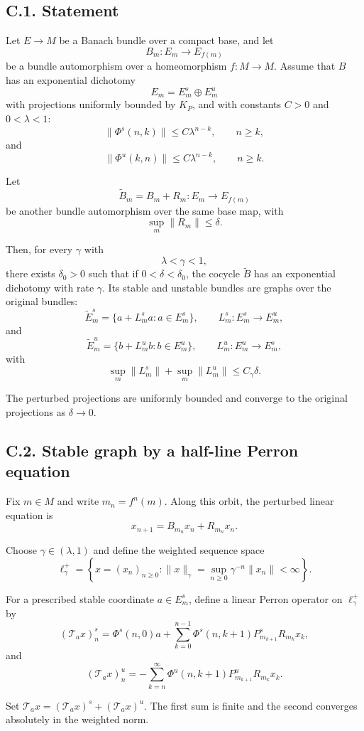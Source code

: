\documentclass[12pt,a4paper]{article}
\theoremstyle{plain}
\numberwithin{equation}{section}
\numberwithin{theorem}{section}
\begin{document}
\subsection{C.1. Statement}

Let $E\to M$ be a Banach bundle over a compact base, and let
\[
B_m:E_m\to E_{f(m)}
\]
be a bundle automorphism over a homeomorphism $f:M\to M$. Assume that $B$ has an exponential dichotomy
\[
E_m=E_m^s\oplus E_m^u
\]
with projections uniformly bounded by $K_P$, and with constants $C>0$ and $0<\lambda<1$:
\[
\|\Phi^s(n,k)\|\le C\lambda^{n-k},
\qquad n\ge k,
\]
and
\[
\|\Phi^u(k,n)\|\le C\lambda^{n-k},
\qquad n\ge k.
\]

Let
\[
\widetilde B_m=B_m+R_m:E_m\to E_{f(m)}
\]
be another bundle automorphism over the same base map, with
\[
\sup_m\|R_m\|\le\delta.
\]

Then, for every $\gamma$ with
\[
\lambda<\gamma<1,
\]
there exists $\delta_0>0$ such that if $0<\delta<\delta_0$, the cocycle $\widetilde B$ has an exponential dichotomy with rate $\gamma$. Its stable and unstable bundles are graphs over the original bundles:
\[
\widetilde E_m^s=\{a+L_m^s a:a\in E_m^s\},
\qquad
L_m^s:E_m^s\to E_m^u,
\]
and
\[
\widetilde E_m^u=\{b+L_m^u b:b\in E_m^u\},
\qquad
L_m^u:E_m^u\to E_m^s,
\]
with
\[
\sup_m\|L_m^s\|+\sup_m\|L_m^u\|
\le C_\gamma\delta.
\]

The perturbed projections are uniformly bounded and converge to the original projections as $\delta\to0$.

\subsection{C.2. Stable graph by a half-line Perron equation}

Fix $m\in M$ and write $m_n=f^n(m)$. Along this orbit, the perturbed linear equation is
\[
x_{n+1}=B_{m_n}x_n+R_{m_n}x_n.
\]

Choose $\gamma\in(\lambda,1)$ and define the weighted sequence space
\[
\ell_\gamma^+
=
\left\{
x=(x_n)_{n\ge0}:
\|x\|_\gamma=
\sup_{n\ge0}\gamma^{-n}\|x_n\|<\infty
\right\}.
\]

For a prescribed stable coordinate $a\in E_m^s$, define a linear Perron operator on $\ell_\gamma^+$ by
\[
(\mathcal T_a x)_n^s
=
\Phi^s(n,0)a
+
\sum_{k=0}^{n-1}
\Phi^s(n,k+1)P^s_{m_{k+1}}R_{m_k}x_k,
\]
and
\[
(\mathcal T_a x)_n^u
=
-
\sum_{k=n}^{\infty}
\Phi^u(n,k+1)P^u_{m_{k+1}}R_{m_k}x_k.
\]

Set $\mathcal T_a x=(\mathcal T_a x)^s+(\mathcal T_a x)^u$. The first sum is finite and the second converges absolutely in the weighted norm.
\end{document}
